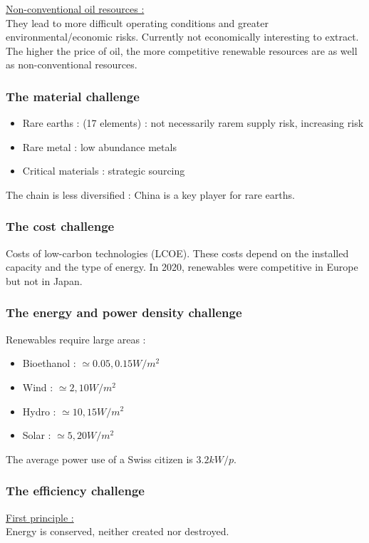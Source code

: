 \documentclass[../main.tex]{subfiles}
\begin{document}
\quad \underline{Non-conventional oil resources :}\\
They lead to more difficult operating conditions and greater environmental/economic risks. Currently not economically interesting to extract.\\

The higher the price of oil, the more competitive renewable resources are as well as non-conventional resources.\\

\subsubsection{The material challenge}
\begin{itemize}
    \item Rare earths : (17 elements) : not necessarily rarem supply risk, increasing risk
    \item Rare metal : low abundance metals
    \item Critical materials : strategic sourcing
\end{itemize}


The chain is less diversified : China is a key player for rare earths.\\

\subsubsection{The cost challenge}
Costs of low-carbon technologies (LCOE). These costs depend on the installed capacity and the type of energy. In 2020, renewables were competitive in Europe but not in Japan.\\

\subsubsection{The energy and power density challenge}

Renewables require large areas : \begin{itemize}
    \item Bioethanol : $\simeq 0.05,0.15 W/m^2$
    \item Wind : $\simeq 2,10 W/m^2$
    \item Hydro : $\simeq 10,15 W/m^2$
    \item Solar : $\simeq 5,20 W/m^2$
\end{itemize}
The average power use of a Swiss citizen is $3.2kW/p$.

\subsubsection{The efficiency challenge}
\quad \underline{First principle :}\\
Energy is conserved, neither created nor destroyed.\\
\end{document}
